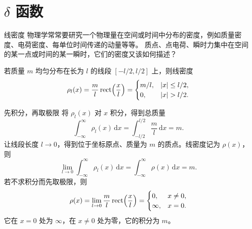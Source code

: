 \documentclass[fontset=windows, chinese, 10pt, xcolor=dvipsnames]{beamer}
\begin{document}
\section{$\delta$ 函数}

\begin{frame}{线密度}
  物理学常常要研究一个物理量在空间或时间中分布的密度，例如质量密度、电荷密度、每单位时间传递的动量等等。
  质点、点电荷、瞬时力集中在空间的某一点或时间的某一瞬时，它们的密度又该如何描述？
  \vspace{0.4em}

  若质量 $m$ 均匀分布在长为 $l$ 的线段 $[-l/2,l/2]$ 上，则线密度
  \begin{equation*}
    \rho_l(x)=\frac{m}{l}\,
      \mathrm{rect}\Bigl(\frac{x}{l}\Bigr)
    =\begin{cases}
      m/l, & |x|\leq l/2,\\
      0, & |x|>l/2.
    \end{cases}
  \end{equation*}
\end{frame}

\begin{frame}{先积分，再取极限}
  将 $\rho_l(x)$ 对 $x$ 积分，得到总质量
  \begin{equation*}
    \int_{-\infty}^{\infty}\rho_l(x)\,\mathrm{d}x
    =\int_{-l/2}^{l/2}\frac{m}{l}\,\mathrm{d}x=m.
  \end{equation*}
  让线段长度 $l\to 0$，得到位于坐标原点、质量为 $m$ 的质点。线密度记为 $\rho(x)$，则
  \begin{equation*}
    \lim_{l\to 0}\int_{-\infty}^{\infty}\rho_l(x)\,\mathrm{d}x
    =\int_{-\infty}^{\infty}\rho(x)\,\mathrm{d}x=m.
  \end{equation*}
  若不求积分而先取极限，则
  \begin{equation*}
    \rho(x)=\lim_{l\to 0}\frac{m}{l}\,
      \mathrm{rect}\Bigl(\frac{x}{l}\Bigr)
    =\begin{cases}
      0, & x\neq 0,\\
      \infty, & x=0.
    \end{cases}
  \end{equation*}
  它在 $x=0$ 处为 $\infty$，在 $x\neq 0$ 处为零，它的积分为 $m$。
\end{frame}
\end{document}
